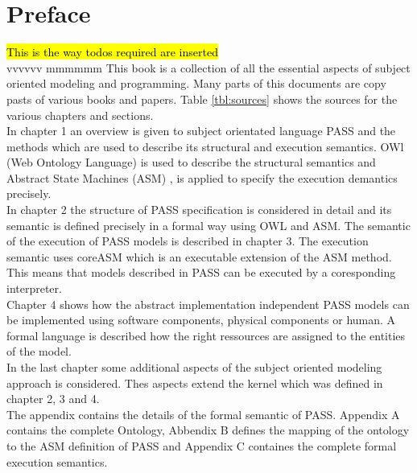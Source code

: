 \documentclass[11pt, showtrims, final, oldfontcommands]{memoir}
\let\added\relax		 %
\begin{document}
\chapter{Preface}
\hl{
	This is the way  todos required are inserted
}\\
 vvvvvv
\added[id=AF, comment=xxxxx]{dddddddddddddddddddd} mmmmmm
This book is a collection of all the essential aspects of subject oriented modeling and programming. Many parts of this documents are copy pasts of various books and papers. Table \ref{tbl:sources} shows the sources for the various chapters and sections.\\
In chapter 1 an overview is given to subject orientated language PASS and the methods which are used to describe its structural and execution semantics. OWl (Web Ontology Language) \cite{Web:OWL} is used to describe the structural semantics and Abstract State Machines (ASM) \cite{book:ASM-2018}, \cite{book:ASM-2003} is applied to specify the execution demantics precisely.\\
In chapter 2 the structure of PASS specification is considered in detail and its semantic is defined precisely in a formal way using OWL and ASM. The semantic of the execution of PASS models is described in chapter 3. The execution semantic uses coreASM which is an executable extension of the ASM method. This means that models described in PASS can be executed by a coresponding interpreter.\\
Chapter 4 shows how the abstract implementation independent PASS models can be implemented using software components, physical components or human.  A formal language is described how the right ressources are assigned to the entities of the model.\\
In the last chapter some additional aspects of the subject oriented modeling approach is considered. Thes aspects extend the kernel which was defined in chapter 2, 3 and 4.\\
The appendix contains the details of the formal semantic of PASS. Appendix A contains the complete Ontology, Abbendix B defines the mapping of the ontology to the ASM definition of PASS and Appendix C containes the complete formal execution semantics.
\end{document}
